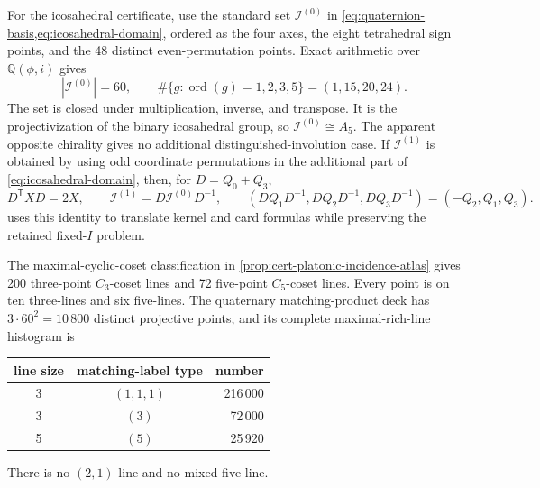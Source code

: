 \documentclass[11pt,letterpaper,onecolumn]{article}
\theoremstyle{plain}
\theoremstyle{definition}
\theoremstyle{remark}
\newcommand{\IcoZero}{{\mathcal I^{(0)}}}
\newcommand{\IcoOne}{{\mathcal I^{(1)}}}
\begin{document}
For the icosahedral certificate, use the standard set \(\IcoZero\) in
\cref{eq:quaternion-basis,eq:icosahedral-domain}, ordered as the four axes, the
eight tetrahedral sign points, and the 48 distinct even-permutation points.
Exact arithmetic over
\(\mathbb Q(\phi,i)\) gives
\hypertarget{eq:cert-A5-orders}{}
\begin{equation*}
 |\IcoZero|=60,
 \qquad
 \#\{g:\operatorname{ord}(g)=1,2,3,5\}=(1,15,20,24).
\end{equation*}
The set is closed under multiplication, inverse, and transpose.
It is the projectivization of the binary icosahedral group, so \(\IcoZero\cong A_5\).
The apparent opposite chirality gives no additional
distinguished-involution case.  If \(\IcoOne\) is obtained by using
odd coordinate permutations in the additional part of
\eqref{eq:icosahedral-domain}, then, for \(D=Q_0+Q_3\),
\hypertarget{eq:cert-A5-chirality}{}
\begin{equation*}
 D^{\mathsf T}XD=2X,
 \qquad
 \IcoOne=D\IcoZero D^{-1},
 \qquad
 (DQ_1D^{-1},DQ_2D^{-1},DQ_3D^{-1})=(-Q_2,Q_1,Q_3).
\end{equation*}
 uses this identity to translate
kernel and card formulas while preserving the retained fixed-\(I\) problem.

The maximal-cyclic-coset classification in
\cref{prop:cert-platonic-incidence-atlas} gives 200 three-point
\(C_3\)-coset lines and 72 five-point \(C_5\)-coset lines.  Every point is
on ten three-lines and six five-lines.  The quaternary matching-product deck
has \(3\cdot60^2=10\,800\) distinct projective points, and its complete
maximal-rich-line histogram is
\begin{center}
\normalsize
\begin{tabular}{ccr}
\toprule
line size&matching-label type&number\\
\midrule
3&\((1,1,1)\)&216\,000\\
3&\((3)\)&72\,000\\
5&\((5)\)&25\,920\\
\bottomrule
\end{tabular}
\end{center}
There is no \((2,1)\) line and no mixed five-line.
\end{document}
